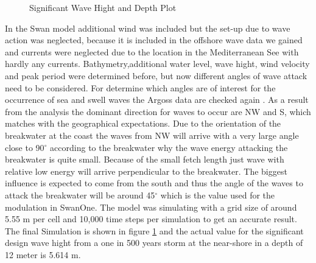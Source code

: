 \begin{figure}[H]
\center
{}
\caption{Significant Wave Hight and Depth Plot}
\label{Hsig_Depth_Plot}
\end{figure}
In the Swan model additional wind was  included but the set-up due to wave action was neglected, because it is included in the offshore wave data we gained and currents were neglected due to the location in the Mediterranean See with hardly any currents.
Bathymetry,additional water level, wave hight, wind velocity and peak period were determined before, but now different angles of wave attack need to be considered.
For determine which angles are of interest for the occurrence of sea and swell waves the Argoss data are checked again 
. As a result from the analysis the dominant direction for waves to occur are NW and S, which matches with the geographical expectations. Due to the orientation of the breakwater at the coast the waves from NW will arrive with a very large angle close to 90$^\circ$ according to the breakwater why the wave energy attacking the breakwater is quite small. Because of the small fetch length just wave with relative low energy will arrive perpendicular to the breakwater. The biggest influence is expected to come from the south and thus the angle of the waves to attack the breakwater will be around 45$^\circ$ which is the value used for the modulation in SwanOne. 
The model was simulating with a grid size of around 5.55 m per cell and 10,000 time steps per simulation to get an accurate result.
The final Simulation is shown in figure \ref{Hsig_Depth_Plot} and the actual value for the significant design wave hight from a one in 500 years storm at the near-shore in a depth of 12 meter is 5.614 m.
